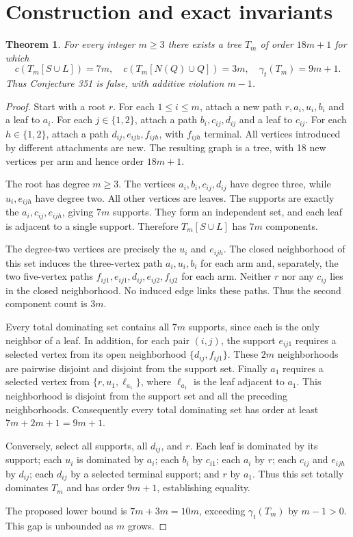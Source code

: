 \documentclass[11pt]{article}
\newtheorem{theorem}{Theorem}
\begin{document}
\section{Construction and exact invariants}
\begin{theorem}
For every integer $m\ge3$ there exists a tree $T_m$ of order $18m+1$ for which
\[
 c(T_m[S\cup L])=7m,\quad c(T_m[N(Q)\cup Q])=3m,
 \quad \gamma_t(T_m)=9m+1.
\]
Thus Conjecture 351 is false, with additive violation $m-1$.
\end{theorem}
\begin{proof}
Start with a root $r$. For each $1\le i\le m$, attach a new path $r,a_i,u_i,b_i$ and a leaf to $a_i$. For each $j\in\{1,2\}$, attach a path $b_i,c_{ij},d_{ij}$ and a leaf to $c_{ij}$. For each $h\in\{1,2\}$, attach a path $d_{ij},e_{ijh},f_{ijh}$, with $f_{ijh}$ terminal. All vertices introduced by different attachments are new. The resulting graph is a tree, with 18 new vertices per arm and hence order $18m+1$.

The root has degree $m\ge3$. The vertices $a_i,b_i,c_{ij},d_{ij}$ have degree three, while $u_i,e_{ijh}$ have degree two. All other vertices are leaves. The supports are exactly the $a_i,c_{ij},e_{ijh}$, giving $7m$ supports. They form an independent set, and each leaf is adjacent to a single support. Therefore $T_m[S\cup L]$ has $7m$ components.

The degree-two vertices are precisely the $u_i$ and $e_{ijh}$. The closed neighborhood of this set induces the three-vertex path $a_i,u_i,b_i$ for each arm and, separately, the two five-vertex paths $f_{ij1},e_{ij1},d_{ij},e_{ij2},f_{ij2}$ for each arm. Neither $r$ nor any $c_{ij}$ lies in the closed neighborhood. No induced edge links these paths. Thus the second component count is $3m$.

Every total dominating set contains all $7m$ supports, since each is the only neighbor of a leaf. In addition, for each pair $(i,j)$, the support $e_{ij1}$ requires a selected vertex from its open neighborhood $\{d_{ij},f_{ij1}\}$. These $2m$ neighborhoods are pairwise disjoint and disjoint from the support set. Finally $a_1$ requires a selected vertex from $\{r,u_1,\ell_{a_1}\}$, where $\ell_{a_1}$ is the leaf adjacent to $a_1$. This neighborhood is disjoint from the support set and all the preceding neighborhoods. Consequently every total dominating set has order at least $7m+2m+1=9m+1$.

Conversely, select all supports, all $d_{ij}$, and $r$. Each leaf is dominated by its support; each $u_i$ is dominated by $a_i$; each $b_i$ by $c_{i1}$; each $a_i$ by $r$; each $c_{ij}$ and $e_{ijh}$ by $d_{ij}$; each $d_{ij}$ by a selected terminal support; and $r$ by $a_1$. Thus this set totally dominates $T_m$ and has order $9m+1$, establishing equality.

The proposed lower bound is $7m+3m=10m$, exceeding $\gamma_t(T_m)$ by $m-1>0$. This gap is unbounded as $m$ grows.
\end{proof}
\end{document}
